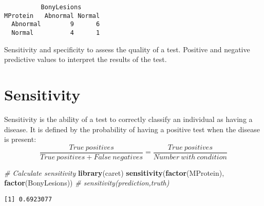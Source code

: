 \documentclass[]{book}
\newenvironment{Shaded}{\begin{snugshade}}{\end{snugshade}}
\newcommand{\KeywordTok}[1]{\textcolor[rgb]{0.13,0.29,0.53}{\textbf{#1}}}
\newcommand{\DecValTok}[1]{\textcolor[rgb]{0.00,0.00,0.81}{#1}}
\newcommand{\StringTok}[1]{\textcolor[rgb]{0.31,0.60,0.02}{#1}}
\newcommand{\CommentTok}[1]{\textcolor[rgb]{0.56,0.35,0.01}{\textit{#1}}}
\newcommand{\OperatorTok}[1]{\textcolor[rgb]{0.81,0.36,0.00}{\textbf{#1}}}
\newcommand{\NormalTok}[1]{#1}
\theoremstyle{definition}
\theoremstyle{definition}
\theoremstyle{definition}
\theoremstyle{remark}
\begin{document}
\begin{Shaded}
\end{Shaded}

\begin{verbatim}
          BonyLesions
MProtein   Abnormal Normal
  Abnormal        9      6
  Normal          4      1
\end{verbatim}

Sensitivity and specificity to assess the quality of a test. Positive
and negative predictive values to interpret the results of the test.

\section{Sensitivity}\label{sensitivity}

Sensitivity is the ability of a test to correctly classify an individual
as having a disease. It is defined by the probability of having a
positive test when the disease is present:
\[{\frac{True\ positives}{True\ positives + False\ negatives}=\frac{True\ positives}{Number\ with\ condition}}\]

\begin{Shaded}
\begin{Highlighting}[]
\CommentTok{# Calculate sensitivity}
\KeywordTok{library}\NormalTok{(caret)}
\KeywordTok{sensitivity}\NormalTok{(}\KeywordTok{factor}\NormalTok{(MProtein), }\KeywordTok{factor}\NormalTok{(BonyLesions)) }\CommentTok{# sensitivity(prediction,truth)}
\end{Highlighting}
\end{Shaded}

\begin{verbatim}
[1] 0.6923077
\end{verbatim}
\end{document}
